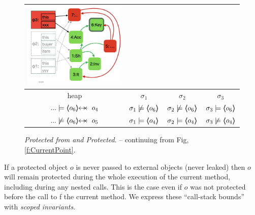 {{\begin{figure}[htb]
\begin{tabular}{|c|c|c|c|}
{\includegraphics[width=\linewidth]{diagrams/ShopD.png}
}
\\
\hline
 heap
&
$\sigma_1$  %
&
$\sigma_2$ 
&
$\sigma_3$ 
\\
\hline 
$... \models \protectedFrom {o_6} {o_4}$
&
$\sigma_1   \not\models \langle\!\!\langle o_6 \rangle\!\!\rangle$
&
$\sigma_2   \not\models \langle\!\!\langle o_6 \rangle\!\!\rangle$
&
$\sigma_3 \models \langle\!\!\langle o_6 \rangle\!\!\rangle$
\\
$... \not\models  \protectedFrom {o_6} {o_5}$
&
$\sigma_1  \models \langle\!\!\langle o_4 \rangle\!\!\rangle$
&
$\sigma_2 \models \langle\!\!\langle o_4 \rangle\!\!\rangle$
&
$\sigma_3 \not \models \langle\!\!\langle o_4 \rangle\!\!\rangle$
\\
\hline %
\end{tabular}
\caption{\textit{Protected from and Protected}. -- continuing from Fig, \ref{f:CurrentPoint}.
 }
   \label{fig:ProtectedBoth}
 \end{figure}

If a protected object $o$ is never passed to external objects (\ie never leaked)  then $o$ will remain protected during the whole execution of the current method,
including during any nested calls.
This is the case even if $o$ was not protected before the call to f the current method.
We express these ``call-stack bounds'' with \emph{scoped invariants}.



}}
